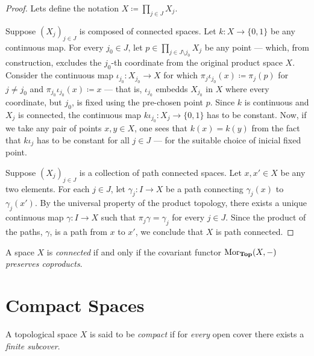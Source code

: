 \begin{proof}
Lets define the notation \(X \coloneq \prod_{j \in J} X_j\).

Suppose \((X_j)_{j \in J}\) is composed of connected spaces. Let
\(k: X \to \{0, 1\}\) be any continuous map. For every \(j_0 \in J\), let
\(p \in \prod_{j \in J \setminus j_0} X_j\) be any point --- which, from
construction, excludes the \(j_0\)-th coordinate from the original product space
\(X\). Consider the continuous map \(\iota_{j_0}: X_{j_0} \to X\) for which
\(\pi_j \iota_{j_0}(x) \coloneq \pi_j(p)\) for \(j \neq j_0\) and
\(\pi_{j_0}\iota_{j_0}(x) \coloneq x\) --- that is, \(\iota_{j_0}\) embedds
\(X_{j_0}\) in \(X\) where every coordinate, but \(j_0\), is fixed using the
pre-chosen point \(p\). Since \(k\) is continuous and \(X_j\) is connected, the
continuous map \(k \iota_{j_0}: X_j \to \{0, 1\}\) has to be constant. Now, if
we take any pair of points \(x, y \in X\), one sees that \(k(x) = k(y)\) from
the fact that \(k \iota_j\) has to be constant for all \(j \in J\) --- for the
suitable choice of inicial fixed point.

Suppose \((X_j)_{j \in J}\) is a collection of path connected spaces. Let
\(x, x' \in X\) be any two elements. For each \(j \in J\), let
\(\gamma_j: I \to X\) be a path connecting \(\gamma_j(x)\) to
\(\gamma_j(x')\). By the universal property of the product topology, there
exists a unique continuous map \(\gamma: I \to X\) such that
\(\pi_j \gamma = \gamma_j\) for every \(j \in J\). Since the product of the
paths, \(\gamma\), is a path from \(x\) to \(x'\), we conclude that \(X\) is
path connected.
\end{proof}

\begin{theorem}
\label{thm:connected-iff-cov-preserves-coprod}
A space \(X\) is \emph{connected} if and only if the covariant functor
\(\operatorname{Mor}_{{\textbf{Top}}}(X, -)\) \emph{preserves coproducts}.
\end{theorem}


\section{Compact Spaces}

\begin{definition}
\label{def:compact-space}
A topological space \(X\) is said to be \emph{compact} if for \emph{every} open
cover there exists a \emph{finite subcover}.
\end{definition}

